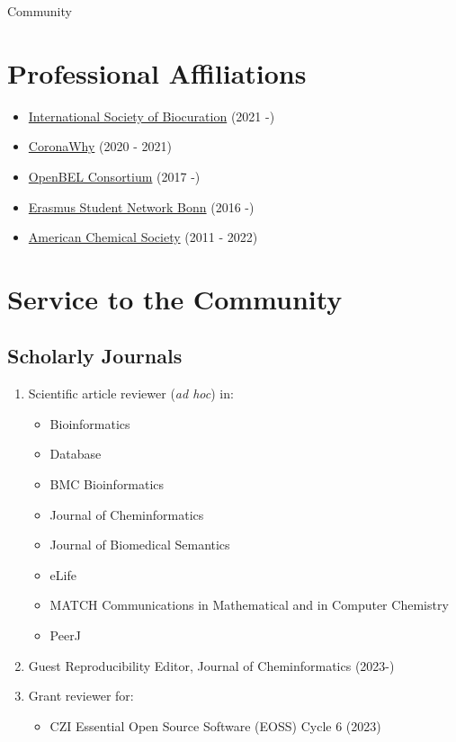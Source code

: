 \documentclass[10pt,a4paper,sans]{moderncv} %
\begin{document}
\begin{enumerate}
    \end{enumerate}


\pagebreak
{\huge Community}

    \section{Professional Affiliations}
    \begin{itemize}
        \item     \href{https://bioregistry.io/wikidata:Q23809291}{International Society of Biocuration} (2021 -)

        \item     \href{https://bioregistry.io/wikidata:Q95587147}{CoronaWhy} (2020 - 2021)

        \item     \href{https://bioregistry.io/wikidata:}{OpenBEL Consortium} (2017 -)

        \item     \href{https://bioregistry.io/wikidata:Q655757}{Erasmus Student Network Bonn} (2016 -)

        \item     \href{https://bioregistry.io/wikidata:Q247556}{American Chemical Society} (2011 - 2022)

    \end{itemize}

\section{Service to the Community}

\subsection{Scholarly Journals}

\begin{enumerate}
\item Scientific article reviewer (\textit{ad hoc}) in:
\begin{itemize}
    \item Bioinformatics
    \item Database
    \item BMC Bioinformatics
    \item Journal of Cheminformatics
    \item Journal of Biomedical Semantics
    \item eLife
    \item MATCH Communications in Mathematical and in Computer Chemistry
    \item PeerJ
\end{itemize}
\item Guest Reproducibility Editor, Journal of Cheminformatics (2023-)
\item Grant reviewer for:
\begin{itemize}
    \item CZI Essential Open Source Software (EOSS) Cycle 6 (2023)
\end{itemize}
\end{enumerate}
\end{document}
